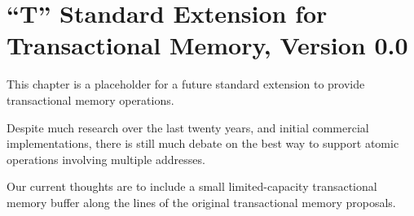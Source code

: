 \chapter{``T'' Standard Extension for Transactional Memory, Version 0.0}
\label{sec:bits}

This chapter is a placeholder for a future standard extension to
provide transactional memory operations.

\begin{commentary}
Despite much research over the last twenty years, and initial
commercial implementations, there is still much debate on the best way
to support atomic operations involving multiple addresses.

Our current thoughts are to include a small limited-capacity
transactional memory buffer along the lines of the original
transactional memory proposals.
\end{commentary}

